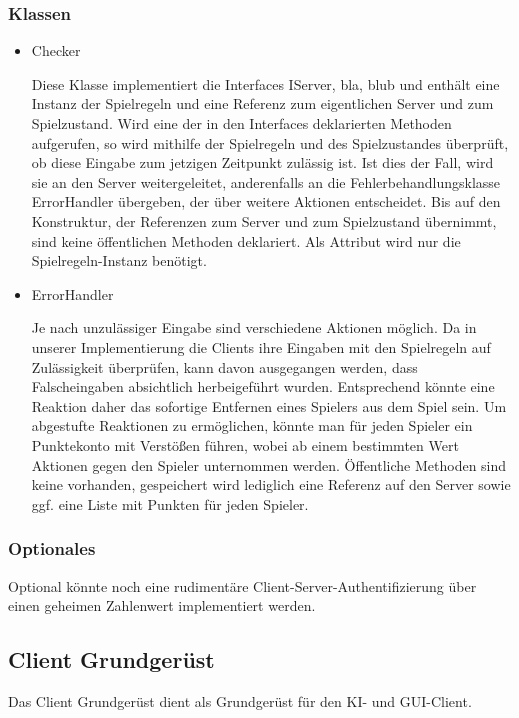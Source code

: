 \documentclass[a4paper,10pt]{article}
\begin{document}
\subsubsection{Klassen}
\begin{itemize}
\item Checker

Diese Klasse implementiert die Interfaces IServer, bla, blub und enthält eine Instanz der Spielregeln und eine Referenz zum eigentlichen Server und zum Spielzustand. Wird eine der in den Interfaces deklarierten Methoden aufgerufen, so wird mithilfe der Spielregeln und des Spielzustandes überprüft, ob diese Eingabe zum jetzigen Zeitpunkt zulässig ist. Ist dies der Fall, wird sie an den Server weitergeleitet, anderenfalls an die Fehlerbehandlungsklasse ErrorHandler übergeben, der über weitere Aktionen entscheidet. Bis auf den Konstruktur, der Referenzen zum Server und zum Spielzustand übernimmt, sind keine öffentlichen Methoden deklariert. Als Attribut wird nur die Spielregeln-Instanz benötigt.
\item ErrorHandler

Je nach unzulässiger Eingabe sind verschiedene Aktionen möglich. Da in unserer Implementierung die Clients ihre Eingaben mit den Spielregeln auf Zulässigkeit überprüfen, kann davon ausgegangen werden, dass Falscheingaben absichtlich herbeigeführt wurden. Entsprechend könnte eine Reaktion daher das sofortige Entfernen eines Spielers aus dem Spiel sein. Um abgestufte Reaktionen zu ermöglichen, könnte man für jeden Spieler ein Punktekonto mit Verstößen führen, wobei ab einem bestimmten Wert Aktionen gegen den Spieler unternommen werden. Öffentliche Methoden sind keine vorhanden, gespeichert wird lediglich eine Referenz auf den Server sowie ggf. eine Liste mit Punkten für jeden Spieler.
\end{itemize}
\subsubsection{Optionales}
Optional könnte noch eine rudimentäre Client-Server-Authentifizierung über einen geheimen Zahlenwert implementiert werden.


\subsection{Client Grundgerüst}
Das Client Grundgerüst dient als Grundgerüst für den KI- und GUI-Client.
\end{document}
